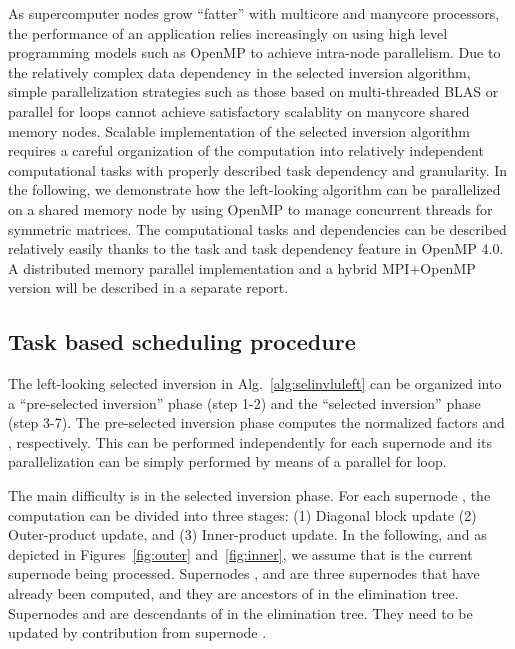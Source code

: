 \documentclass[10pt, conference, compsocconf,letterpaper,twocolumn]{IEEEtran}
\begin{document}
As supercomputer nodes grow ``fatter'' with multicore and manycore 
processors, the performance of an application relies increasingly 
on using high level programming models such as OpenMP to achieve 
intra-node parallelism. Due to the relatively complex data dependency in the 
selected inversion algorithm, simple parallelization strategies such as those 
based on multi-threaded BLAS or parallel \textsf{for} loops cannot achieve
satisfactory scalablity on manycore shared memory nodes. 
Scalable implementation of the selected inversion algorithm requires a careful organization of the computation into relatively independent computational tasks with properly described task dependency and granularity. 
In the following, we demonstrate how the left-looking algorithm 
can be parallelized on a shared memory node by using OpenMP to manage concurrent threads for symmetric matrices. The computational tasks and dependencies can be described relatively easily thanks to the \textsf{task} and \textsf{task dependency} feature in OpenMP 4.0. A distributed memory parallel implementation and a hybrid MPI+OpenMP version will be described in a separate report.






\subsection{Task based scheduling procedure}



The left-looking selected inversion in Alg.~\ref{alg:selinvluleft} can be organized into a ``pre-selected inversion'' phase (step 1-2) and the ``selected inversion'' phase (step 3-7). The pre-selected inversion phase computes the normalized  factors  and , respectively. This can be performed independently for each supernode  and its parallelization can be simply performed by means of a parallel \textsf{for} loop.

The main difficulty is in the selected inversion phase. For each supernode , the computation can be divided into 
three stages: (1) Diagonal block update (2) Outer-product update, and (3) Inner-product update.
In the following, and as depicted in Figures~\ref{fig:outer} and~\ref{fig:inner}, we assume that  is the current
supernode being processed. Supernodes ,  and
 are three supernodes that have already been 
computed, and they are ancestors of  in the elimination tree. 
Supernodes  and  are
descendants of  in the elimination tree. They need
to be updated by contribution from supernode .
\end{document}
